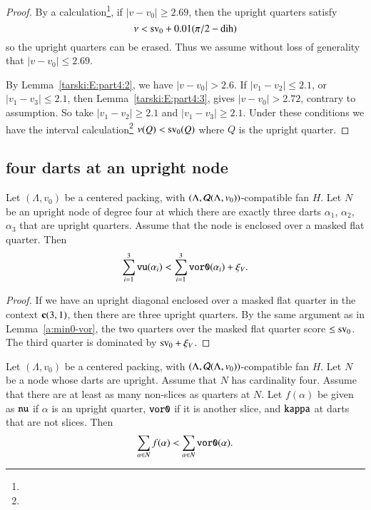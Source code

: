 \begin{proof}
By a calculation\footnote{}, if $|v-v_0|\ge 2.69$,
then the upright quarters satisfy
    $$\nu < {\operatorname{sv}}_0 + 0.01 (\pi/2-\operatorname{dih})$$
so the upright quarters can be erased.  Thus we assume without
loss of generality that $|v-v_0|\le 2.69$.

By Lemma~\ref{tarski:E:part4:2}, we have $|v-v_0|>2.6$.
If $|v_1-v_2|\le 2.1$,  or $|v_1-v_3|\le 2.1$, then
Lemma~\ref{tarski:E:part4:3}, gives $|v-v_0|>2.72$, 
 contrary to assumption.  So take $|v_1-v_2|\ge 2.1$ and
$|v_1-v_3|\ge2.1$. Under these conditions we have the interval
calculation\footnote{} %
  $\nu(Q) < {\operatorname{sv}}_0(Q)$ where $Q$ is the upright quarter.
\end{proof}


\subsection{four darts at an upright node}


\begin{lemma}
\label{remark:3rd-quarter} 
Let $(\Lambda,v_0)$ be a centered packing, 
with $(\Lambda,{\mathcal Q}(\Lambda,v_0))$-compatible fan $H$.
Let $N$ be an upright node of degree four at which there are
exactly three darts $\alpha_1$, $\alpha_2$, $\alpha_3$
that are upright quarters.  Assume that the node is enclosed
over a masked flat quarter.  
Then
 $$
 \sum_{i=1}^3{\operatorname{{\texttt{vu}}}}(\alpha_i) <
     \sum_{i=1}^3{\operatorname{{\texttt{vor0}}}}(\alpha_i) + \xi_V.
 $$
\end{lemma}

\begin{proof}
 If we have an upright diagonal enclosed
over a masked flat quarter in the context ${\operatorname{\bf c}}{(3,1)}$, then there are
three upright quarters.  By the same argument as in Lemma~\ref{a:min0-vor}, 
the two quarters over the masked flat quarter score $\le{\operatorname{sv}}_0$. The
third quarter is dominated by ${\operatorname{sv}}_0 + \xi_V$.
\end{proof}


\begin{lemma}
Let $(\Lambda,v_0)$ be a centered packing, 
with $(\Lambda,{\mathcal Q}(\Lambda,v_0))$-compatible fan $H$.
Let $N$ be a node
whose darts are upright.  Assume that $N$ has cardinality four.
Assume that there are at least as many non-slices as quarters at $N$.
Let $f(\alpha)$ be given as ${\operatorname{{\texttt{nu}}}}$ if $\alpha$ is an upright
quarter, ${\operatorname{{\texttt{vor0}}}}$ if it is another slice, and
${\operatorname{{\texttt{kappa}}}}$ at darts that are not slices.  Then
  $$
  \sum_{\alpha\in N} f(\alpha) < \sum_{\alpha\in N} {\operatorname{{\texttt{vor0}}}}(\alpha).
  $$
\end{lemma}

